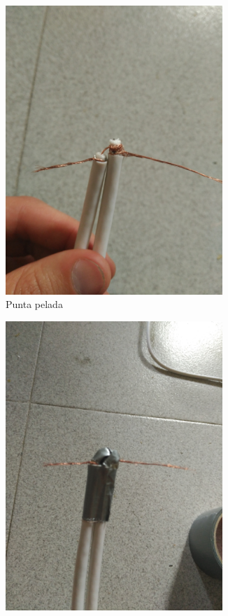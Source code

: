 \begin{figure}[H]
\centering
\begin{subfigure}{.5\textwidth}
	\centering
	\includegraphics[width=0.9\textwidth]{./images/balun_pelat}
	\caption{Punta pelada}
	\label{balun1}
\end{subfigure}%
\begin{subfigure}{.5\textwidth}
	\centering
	\includegraphics[width=0.9\textwidth]{./images/balun_aillat}

\end{subfigure}
\end{figure}
